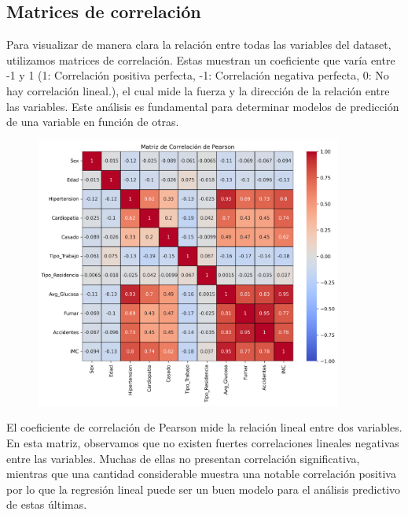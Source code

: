 \documentclass[a4paper, 12pt]{article}
\begin{document}
\subsection{Matrices de correlación}
Para visualizar de manera clara la relación entre todas las variables del dataset, utilizamos matrices de correlación. Estas muestran un coeficiente que varía entre -1 y 1 (1: Correlación positiva perfecta, -1: Correlación negativa perfecta, 0: No hay correlación lineal.), el cual mide la fuerza y la dirección de la relación entre las variables. Este análisis es fundamental para determinar modelos de predicción de una variable en función de otras.
\begin{figure}[H]
    \centering
    \includegraphics[width=0.9\textwidth]{img/matriz_correlacion_pearson.png}
\end{figure}

El coeficiente de correlación de Pearson mide la relación lineal entre dos variables. En esta matriz, 
observamos que no existen fuertes correlaciones lineales negativas entre las variables. Muchas de ellas 
no presentan correlación significativa, mientras que una cantidad considerable muestra una notable 
correlación positiva por lo que la regresión lineal puede ser un buen modelo para el análisis predictivo de estas últimas.
\end{document}
